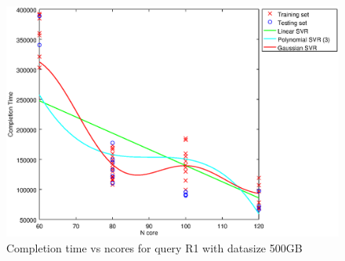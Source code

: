 
\begin {figure}[hbtp]
\centering
\includegraphics[width=\textwidth]{output/R1_500_ONLY_1_LINEAR_NCORE/plot_R1_500_bestmodels.eps}
\caption{Completion time vs ncores for query R1 with datasize 500GB}
\label{fig:only_1_linear_R1_500}
\end {figure}
